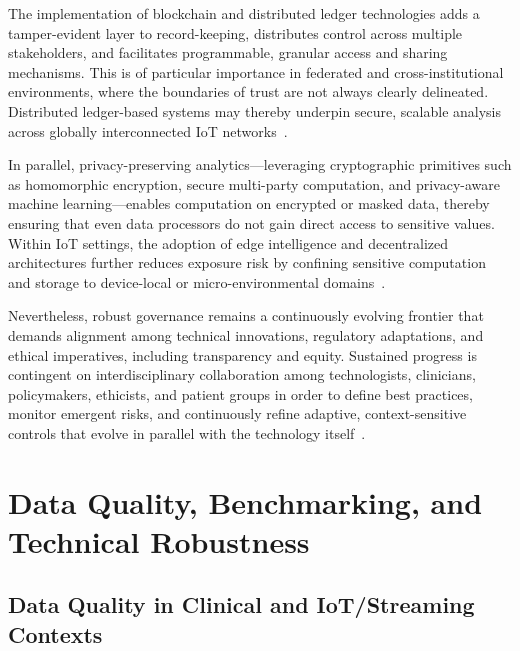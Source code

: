 The implementation of blockchain and distributed ledger technologies adds a tamper-evident layer to record-keeping, distributes control across multiple stakeholders, and facilitates programmable, granular access and sharing mechanisms. This is of particular importance in federated and cross-institutional environments, where the boundaries of trust are not always clearly delineated. Distributed ledger-based systems may thereby underpin secure, scalable analysis across globally interconnected IoT networks~\cite{ref4, ref5, ref10, ref13, ref14, ref16, ref17, ref18, ref19, ref20, ref21, ref22, ref23, ref24, ref25, ref30, ref31, ref33, ref34, ref35, ref44, ref45, ref46, ref50, ref51, ref61, ref62, ref64, ref65, ref76, ref77, ref91, ref106}.

In parallel, privacy-preserving analytics—leveraging cryptographic primitives such as homomorphic encryption, secure multi-party computation, and privacy-aware machine learning—enables computation on encrypted or masked data, thereby ensuring that even data processors do not gain direct access to sensitive values. Within IoT settings, the adoption of edge intelligence and decentralized architectures further reduces exposure risk by confining sensitive computation and storage to device-local or micro-environmental domains~\cite{ref4, ref5, ref10, ref16, ref17, ref18, ref19, ref20, ref21, ref22, ref23, ref24, ref25, ref44, ref45, ref61, ref62, ref64, ref65, ref76, ref77, ref91, ref106}.

Nevertheless, robust governance remains a continuously evolving frontier that demands alignment among technical innovations, regulatory adaptations, and ethical imperatives, including transparency and equity. Sustained progress is contingent on interdisciplinary collaboration among technologists, clinicians, policymakers, ethicists, and patient groups in order to define best practices, monitor emergent risks, and continuously refine adaptive, context-sensitive controls that evolve in parallel with the technology itself~\cite{ref91, ref106}.

\section{Data Quality, Benchmarking, and Technical Robustness}

\subsection{Data Quality in Clinical and IoT/Streaming Contexts}

